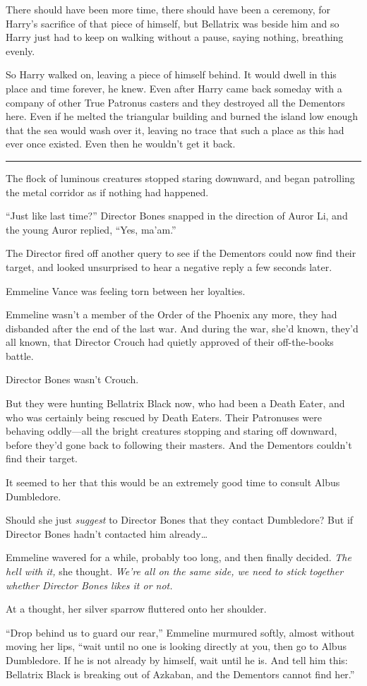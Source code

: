 There should have been more time, there should have been a ceremony, for
Harry's sacrifice of that piece of himself, but Bellatrix was beside him
and so Harry just had to keep on walking without a pause, saying
nothing, breathing evenly.

So Harry walked on, leaving a piece of himself behind. It would dwell in
this place and time forever, he knew. Even after Harry came back someday
with a company of other True Patronus casters and they destroyed all the
Dementors here. Even if he melted the triangular building and burned the
island low enough that the sea would wash over it, leaving no trace that
such a place as this had ever once existed. Even then he wouldn't get it
back.

\begin{center}\rule{3in}{0.4pt}\end{center}

The flock of luminous creatures stopped staring downward, and began
patrolling the metal corridor as if nothing had happened.

``Just like last time?'' Director Bones snapped in the direction of
Auror Li, and the young Auror replied, ``Yes, ma'am.''

The Director fired off another query to see if the Dementors could now
find their target, and looked unsurprised to hear a negative reply a few
seconds later.

Emmeline Vance was feeling torn between her loyalties.

Emmeline wasn't a member of the Order of the Phoenix any more, they had
disbanded after the end of the last war. And during the war, she'd
known, they'd all known, that Director Crouch had quietly approved of
their off-the-books battle.

Director Bones wasn't Crouch.

But they were hunting Bellatrix Black now, who had been a Death Eater,
and who was certainly being rescued by Death Eaters. Their Patronuses
were behaving oddly---all the bright creatures stopping and staring off
downward, before they'd gone back to following their masters. And the
Dementors couldn't find their target.

It seemed to her that this would be an extremely good time to consult
Albus Dumbledore.

Should she just \emph{suggest} to Director Bones that they contact
Dumbledore? But if Director Bones hadn't contacted him already\ldots{}

Emmeline wavered for a while, probably too long, and then finally
decided. \emph{The hell with it,} she thought. \emph{We're all on the
same side, we need to stick together whether Director Bones likes it or
not.}

At a thought, her silver sparrow fluttered onto her shoulder.

``Drop behind us to guard our rear,'' Emmeline murmured softly, almost
without moving her lips, ``wait until no one is looking directly at you,
then go to Albus Dumbledore. If he is not already by himself, wait until
he is. And tell him this: Bellatrix Black is breaking out of Azkaban,
and the Dementors cannot find her.''
